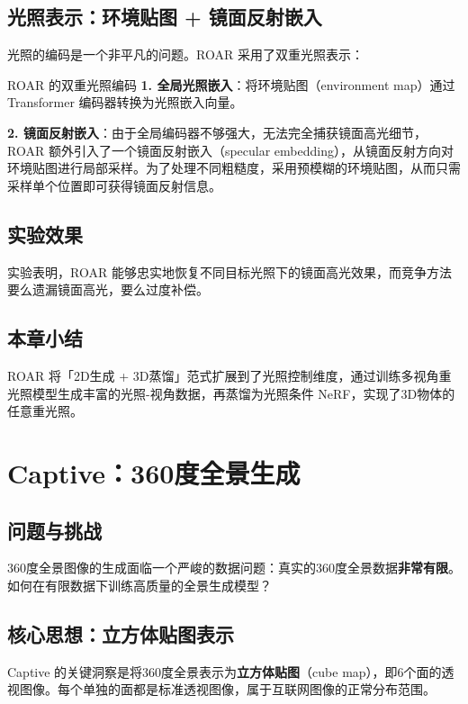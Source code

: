 \documentclass[a4paper]{article}
\begin{document}
\subsection{光照表示：环境贴图 + 镜面反射嵌入}

光照的编码是一个非平凡的问题。ROAR 采用了双重光照表示：

\begin{importantbox}{ROAR 的双重光照编码}
\textbf{1. 全局光照嵌入}：将环境贴图（environment map）通过 Transformer 编码器转换为光照嵌入向量。

\textbf{2. 镜面反射嵌入}：由于全局编码器不够强大，无法完全捕获镜面高光细节，ROAR 额外引入了一个镜面反射嵌入（specular embedding），从镜面反射方向对环境贴图进行局部采样。为了处理不同粗糙度，采用预模糊的环境贴图，从而只需采样单个位置即可获得镜面反射信息。
\end{importantbox}

\subsection{实验效果}

实验表明，ROAR 能够忠实地恢复不同目标光照下的镜面高光效果，而竞争方法要么遗漏镜面高光，要么过度补偿。

\subsection{本章小结}

ROAR 将「2D生成 + 3D蒸馏」范式扩展到了光照控制维度，通过训练多视角重光照模型生成丰富的光照-视角数据，再蒸馏为光照条件 NeRF，实现了3D物体的任意重光照。

\section{Captive：360度全景生成}

\subsection{问题与挑战}

360度全景图像的生成面临一个严峻的数据问题：真实的360度全景数据\textbf{非常有限}。如何在有限数据下训练高质量的全景生成模型？

\subsection{核心思想：立方体贴图表示}

Captive 的关键洞察是将360度全景表示为\textbf{立方体贴图}（cube map），即6个面的透视图像。每个单独的面都是标准透视图像，属于互联网图像的正常分布范围。
\end{document}
